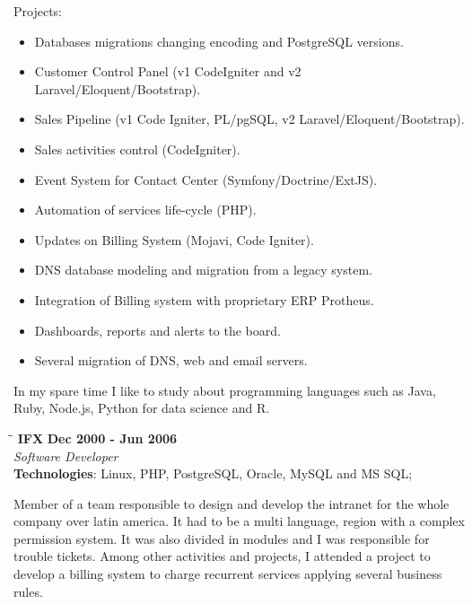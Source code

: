 \documentclass[margin]{res}
\begin{document}
\begin{resume}
    Projects:
    \begin{itemize}
      \item Databases migrations changing encoding and PostgreSQL versions.
      \item Customer Control Panel (v1 CodeIgniter and v2 Laravel/Eloquent/Bootstrap).
      \item Sales Pipeline (v1 Code Igniter, PL/pgSQL, v2 Laravel/Eloquent/Bootstrap).
      \item Sales activities control (CodeIgniter).
      \item Event System for Contact Center (Symfony/Doctrine/ExtJS).
      \item Automation of services life-cycle (PHP).
      \item Updates on Billing System (Mojavi, Code Igniter).
      \item DNS database modeling and migration from a legacy system.
      \item Integration of Billing system with proprietary ERP Protheus.
      \item Dashboards, reports and alerts to the board.
      \item Several migration of DNS, web and email servers.
    \end{itemize}

In my spare time I like to study about programming languages such as Java, Ruby, Node.js, Python for data science and R.

\vspace{-0.1in}

\vspace{-0.1in}
   \begin{tabbing}
   \hspace{2.3in}\= \hspace{1.7in}\= \kill %
    \textbf{IFX}    \>\>\textbf{Dec 2000 - Jun 2006}\\
    \textit{Software Developer}\\        
    \textbf{Technologies}: Linux, PHP, PostgreSQL, Oracle, MySQL and MS SQL;
   \end{tabbing}\vspace{-20pt}      %
    \vspace{2mm}
        Member of a team responsible to design and develop the intranet for the whole company over latin america. 
        It had to be a multi language, region with a complex permission system. It was also divided in modules and I was responsible for trouble tickets.
        Among other activities and projects, I attended a project to develop a billing system to charge recurrent services applying several business rules.
\vspace{-0.1in}


\end{resume}
\end{document}

